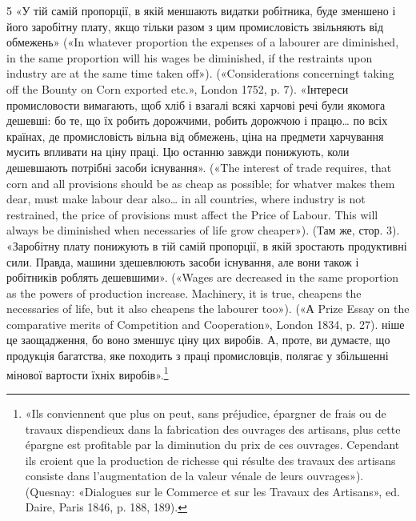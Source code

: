 5 «У тій самій пропорції, в якій меншають видатки робітника, буде
зменшено і його заробітну плату, якщо тільки разом з цим промисловість
звільняють від обмежень» («In whatever proportion the expenses of a
labourer are diminished, in the same proportion will his wages be diminished,
if the restraints upon industry are at the same time taken off»).
(«Considerations concerningt taking off the Bounty on Corn exported etc.»,
London 1752, p. 7). «Інтереси промисловости вимагають, щоб хліб і
взагалі всякі харчові речі були якомога дешевші: бо те, що їх робить
дорожчими, робить дорожчою і працю\dots{} по всіх країнах, де промисловість вільна від обмежень, ціна на
предмети харчування мусить впливати
на ціну праці. Цю останню завжди понижують, коли дешевшають потрібні
засоби існування». («The interest of trade requires, that corn and all provisions should be as cheap
as possible; for whatver makes them dear, must
make labour dear also\dots{} in all countries, where industry is not restrained,
the price of provisions must affect the Price of Labour. This will always
be diminished when necessaries of life grow cheaper»). (Там же, стор. 3).
«Заробітну плату понижують в тій самій пропорції, в якій зростають
продуктивні сили. Правда, машини здешевлюють засоби існування, але
вони також і робітників роблять дешевшими». («Wages are decreased
in the same proportion as the powers of production increase. Machinery,
it is true, cheapens the necessaries of life, but it also cheapens the labourer
too»). («А Prize Essay on the comparative merits of Competition and
Cooperation», London 1834, p. 27).
ніше це заощадження, бо воно зменшує ціну цих виробів. А, проте,
ви думаєте, що продукція багатства, яке походить з праці промисловців, полягає у збільшенні мінової
вартости їхніх виробів».\footnote{
«Ils conviennent que plus on peut, sans préjudice, épargner de frais ou
de travaux dispendieux dans la fabrication des ouvrages des artisans, plus
cette épargne est profitable par la diminution du prix de ces ouvrages.
Cependant ils croient que la production de richesse qui résulte des travaux
des artisans consiste dans l’augmentation de la valeur vénale de leurs ouvrages»).
(Quesnay: «Dialogues sur le Commerce et sur les Travaux des
Artisans», ed. Daire, Paris 1846, p. 188, 189).
}

